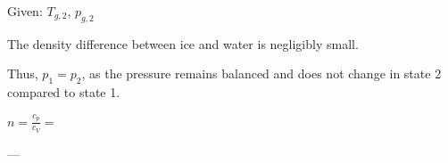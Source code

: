 Given: \( T_{g,2} \), \( p_{g,2} \)  

The density difference between ice and water is negligibly small.  

Thus, \( p_1 = p_2 \), as the pressure remains balanced and does not change in state 2 compared to state 1.  

\( n = \frac{c_p}{c_V} = \)  

---